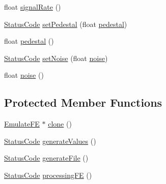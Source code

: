 \begin{DoxyCompactItemize}
\item 
float \hyperlink{classEmulateFE_a98d2e402e4707109ca14ee9f4d95c2fa}{signal\+Rate} ()
\item 
\hyperlink{classStatusCode}{Status\+Code} \hyperlink{classEmulateFE_a6328b50231c29fc5a7e6df99a3db3a29}{set\+Pedestal} (float \hyperlink{classEmulateFE_a8442db97da7b2a97fe97745e6d8d9161}{pedestal})
\item 
float \hyperlink{classEmulateFE_a8442db97da7b2a97fe97745e6d8d9161}{pedestal} ()
\item 
\hyperlink{classStatusCode}{Status\+Code} \hyperlink{classEmulateFE_a9b1d0d30631d304fc615c064db8231ca}{set\+Noise} (float \hyperlink{classEmulateFE_a3e1a2e88567bf16a5599a1602d6ba50d}{noise})
\item 
float \hyperlink{classEmulateFE_a3e1a2e88567bf16a5599a1602d6ba50d}{noise} ()
\end{DoxyCompactItemize}
\subsection*{Protected Member Functions}
\begin{DoxyCompactItemize}
\item 
\hyperlink{classEmulateFE_1_1EmulateFE}{Emulate\+FE} $\ast$ \hyperlink{classEmulateFE_a9a704d0081a275410d19071a006f1a80}{clone} ()
\item 
\hyperlink{classStatusCode}{Status\+Code} \hyperlink{classEmulateFE_ae557d3569b9285a871c502b93ba20494}{generate\+Values} ()
\item 
\hyperlink{classStatusCode}{Status\+Code} \hyperlink{classEmulateFE_ae62bc56b44c4bcdf7f5eab5cbde2cd69}{generate\+File} ()
\item 
\hyperlink{classStatusCode}{Status\+Code} \hyperlink{classEmulateFE_adf7213a308c8a04f4d7efbb86a13689e}{processing\+FE} ()
\end{DoxyCompactItemize}
